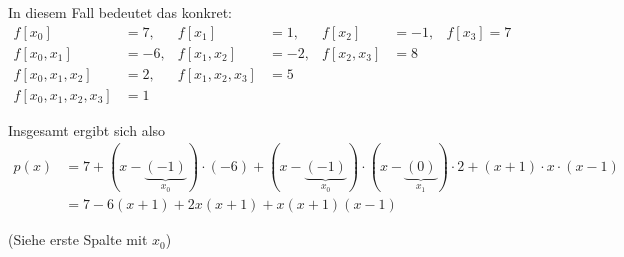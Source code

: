In diesem Fall bedeutet das konkret:
\begin{align}
	f[x_0] &= 7,           &f[x_1] &= 1,       & f[x_2] &= -1,     & f[x_3] = 7\\
	f[x_0, x_1] &= -6,     &f[x_1, x_2] &= -2, &f[x_2, x_3] &= 8\\
	f[x_0, x_1, x_2] &= 2, &f[x_1, x_2, x_3] &= 5\\
	f[x_0, x_1, x_2, x_3] &= 1
\end{align}

Insgesamt ergibt sich also
\begin{align}
	p(x) &= 7 + (x-\underbrace{(-1)}_{x_0}) \cdot (-6) + (x-\underbrace{(-1)}_{x_0}) \cdot (x-\underbrace{(0)}_{x_1}) \cdot 2 + (x+1) \cdot x \cdot (x-1)\\
    &= 7 -6 (x+1) + 2x(x+1) + x(x+1)(x-1)
\end{align}

(Siehe erste Spalte mit $x_0$)
